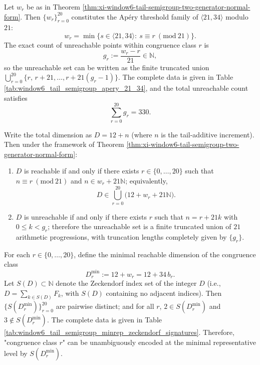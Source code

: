 \begin{proposition}\label{prop:xi-window6-tail-semigroup-apery-thresholds}
Let \(w_r\) be as in Theorem \ref{thm:xi-window6-tail-semigroup-two-generator-normal-form}.
Then \(\{w_r\}_{r=0}^{20}\) constitutes the Ap\'ery threshold family of \(\langle 21,34\rangle\) modulo \(21\):
\[
w_r=\min\{s\in\langle 21,34\rangle:\ s\equiv r\ (\mathrm{mod}\ 21)\}.
\]
The exact count of unreachable points within congruence class \(r\) is
\[
g_r:=\frac{w_r-r}{21}\in\mathbb N,
\]
so the unreachable set can be written as the finite truncated union
\(
\bigcup_{r=0}^{20}\{r,\,r+21,\dots,r+21(g_r-1)\}
\).
The complete data is given in Table \ref{tab:window6_tail_semigroup_apery_21_34}, and the total unreachable count satisfies
\[
\sum_{r=0}^{20}g_r=330.
\]
\end{proposition}



\begin{proposition}\label{prop:xi-window6-dimension-reachability-congruence-union}
Write the total dimension as \(D=12+n\) (where \(n\) is the tail-additive increment).
Then under the framework of Theorem \ref{thm:xi-window6-tail-semigroup-two-generator-normal-form}:
\begin{enumerate}
  \item \(D\) is reachable if and only if there exists \(r\in\{0,\dots,20\}\) such that \(n\equiv r\ (\mathrm{mod}\ 21)\) and \(n\in w_r+21\mathbb N\);
  equivalently,
  \[
  D\in\bigcup_{r=0}^{20}\bigl(12+w_r+21\mathbb N\bigr).
  \]
  \item \(D\) is unreachable if and only if there exists \(r\) such that \(n=r+21k\) with \(0\le k<g_r\);
  therefore the unreachable set is a finite truncated union of \(21\) arithmetic progressions, with truncation lengths completely given by \(\{g_r\}\).
\end{enumerate}
\end{proposition}

\begin{proposition}\label{prop:xi-window6-minrep-zeckendorf-signature-injection}
For each \(r\in\{0,\dots,20\}\), define the minimal reachable dimension of the congruence class
\[
D_r^{\min}:=12+w_r=12+34\,b_r.
\]
Let \(S(D)\subset\mathbb N\) denote the Zeckendorf index set of the integer \(D\) (i.e., \(D=\sum_{k\in S(D)}F_k\), with \(S(D)\) containing no adjacent indices).
Then \(\{S(D_r^{\min})\}_{r=0}^{20}\) are pairwise distinct;
and for all \(r\), \(2\in S(D_r^{\min})\) and \(3\notin S(D_r^{\min})\).
The complete data is given in Table \ref{tab:window6_tail_semigroup_minrep_zeckendorf_signatures}.
Therefore, "congruence class \(r\)" can be unambiguously encoded at the minimal representative level by \(S(D_r^{\min})\).
\end{proposition}

